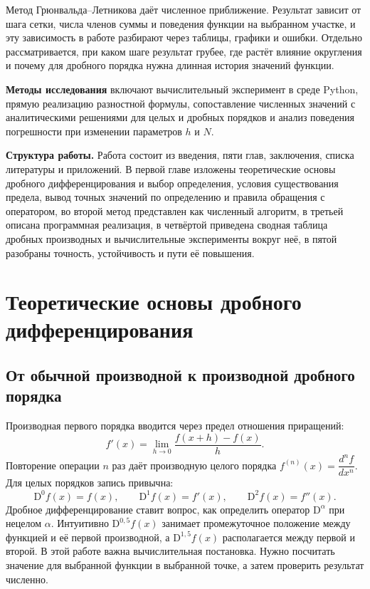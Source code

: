 \documentclass[14pt,a4paper]{extarticle}
\newcommand{\D}{\mathrm{D}}
\begin{document}
Метод Грюнвальда--Летникова даёт численное приближение. Результат зависит от шага сетки, числа членов суммы и поведения функции на выбранном участке, и эту зависимость в работе разбирают через таблицы, графики и ошибки. Отдельно рассматривается, при каком шаге результат грубее, где растёт влияние округления и почему для дробного порядка нужна длинная история значений функции.

\textbf{Методы исследования} включают вычислительный эксперимент в среде Python, прямую реализацию разностной формулы, сопоставление численных значений с аналитическими решениями для целых и дробных порядков и анализ поведения погрешности при изменении параметров $h$ и $N$.

\textbf{Структура работы.} Работа состоит из введения, пяти глав, заключения, списка литературы и приложений. В первой главе изложены теоретические основы дробного дифференцирования и выбор определения, условия существования предела, вывод точных значений по определению и правила обращения с оператором, во второй метод представлен как численный алгоритм, в третьей описана программная реализация, в четвёртой приведена сводная таблица дробных производных и вычислительные эксперименты вокруг неё, в пятой разобраны точность, устойчивость и пути её повышения.

\section{Теоретические основы дробного дифференцирования}

\subsection{От обычной производной к производной дробного порядка}

Производная первого порядка вводится через предел отношения приращений:
\begin{equation}
f'(x) = \lim_{h\to 0}\frac{f(x+h)-f(x)}{h}.
\end{equation}
Повторение операции $n$ раз даёт производную целого порядка $f^{(n)}(x)=\dfrac{d^n f}{dx^n}$. Для целых порядков запись привычна:
\begin{equation}
\D^0 f(x)=f(x),\qquad \D^1 f(x)=f'(x),\qquad \D^2 f(x)=f''(x).
\end{equation}
Дробное дифференцирование ставит вопрос, как определить оператор $\D^{\alpha}$ при нецелом $\alpha$. Интуитивно $\D^{0{,}5}f(x)$ занимает промежуточное положение между функцией и её первой производной, а $\D^{1{,}5}f(x)$ располагается между первой и второй. В этой работе важна вычислительная постановка. Нужно посчитать значение для выбранной функции в выбранной точке, а затем проверить результат численно.
\end{document}
